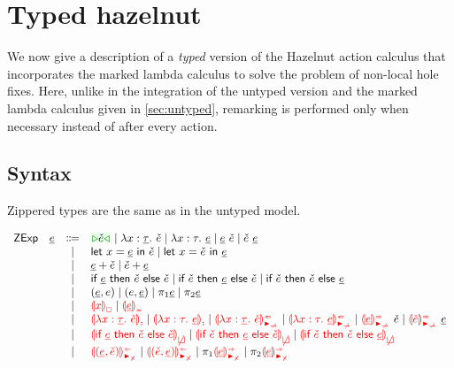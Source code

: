 \documentclass[formalism.tex]{subfiles}
\begin{document}






\section{Typed hazelnut}
\label{sec:typed}
We now give a description of a \emph{typed} version of the Hazelnut action calculus that
incorporates the marked lambda calculus to solve the problem of non-local hole fixes. Here, unlike
in the integration of the untyped version and the marked lambda calculus given in
\cref{sec:untyped}, remarking is performed only when necessary instead of after every action.

\nomechanization{}

\subsection{Syntax}
\label{sec:typed-syntax}
Zippered types are the same as in the untyped model.

\[\begin{array}{rrcl}
  \ZMName  & \ZMV  & \Coloneqq & \ZCursor{\ECMV} \mid \ZLamT{x}{\ZTMV}{\ECMV} \mid \ZLamE{x}{\TMV}{\ZMV} \mid \ZApL{\ZMV}{\ECMV} \mid \ZApR{\ECMV}{\ZMV} \\
           &       & \mid         & \ZLetL{x}{\ZMV}{\ECMV} \mid \ZLetR{x}{\ECMV}{\ZMV} \\
           &       & \mid         & \ZPlusL{\ZMV}{\ECMV} \mid \ZPlusR{\ECMV}{\ZMV} \\
           &       & \mid         & \ZIfC{\ZMV}{\ECMV}{\ECMV} \mid \ZIfL{\ECMV}{\ZMV}{\ECMV} \mid \ZIfR{\ECMV}{\ECMV}{\ZMV} \\
           &       & \mid         & \ZPairL{\ZMV}{\EMV} \mid \ZPairR{\EMV}{\ZMV} \mid \ZProjL{\ZMV} \mid \ZProjR{\ZMV} \\
           &       & \mid         & \ZFree{x} \mid \ZInconType{\ZMV} \\
           &       & \mid         & \ZLamInconAscT{x}{\ZTMV}{\ECMV} \mid \ZLamInconAscE{x}{\TMV}{\ZMV}
                     \mid           \ZLamAnaNonMatchedArrowT{x}{\ZTMV}{\ECMV} \mid \ZLamAnaNonMatchedArrowE{x}{\TMV}{\ZMV}
                     \mid           \ZApSynNonMatchedArrowL{\ZMV}{\ECMV} \mid \ZApSynNonMatchedArrowR{\ECMV}{\ZMV} \\
           &       & \mid         & \ZInconBrC{\ZMV}{\ECMV}{\ECMV} \mid \ZInconBrL{\ECMV}{\ZMV}{\ECMV} \mid \ZInconBrR{\ECMV}{\ECMV}{\ZMV} \\
           &       & \mid         & \ZPairAnaNonMatchedProdL{\ZMV}{\ECMV} \mid \ZPairAnaNonMatchedProdR{\ECMV}{\ZMV}
                     \mid           \ZProjLSynNonMatchedProd{\ZMV} \mid \ZProjRSynNonMatchedProd{\ZMV}
\end{array}\]
\end{document}
